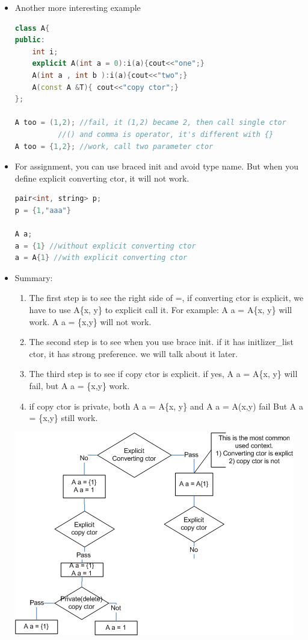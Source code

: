 \documentclass[a4paper,11pt,twoside]{book}
\begin{document}
\begin{itemize}
\item Another more interesting example 

\begin{lstlisting}[frame=single, language=c++]
class A{
public:
	int i;
	explicit A(int a = 0):i(a){cout<<"one";}
	A(int a , int b ):i(a){cout<<"two";}
	A(const A &T){ cout<<"copy ctor";} 
};

A too = (1,2); //fail, it (1,2) became 2, then call single ctor
          //() and comma is operator, it's different with {}
A too = {1,2}; //work, call two parameter ctor
\end{lstlisting}


	\item For assignment, you can use braced init and avoid type name. But when you define explicit converting ctor, it will not work. 
\begin{lstlisting}[frame=single, language=c++]
pair<int, string> p;
p = {1,"aaa"}

A a;
a = {1} //without explicit converting ctor
a = A{1} //with explicit converting ctor
\end{lstlisting}


\item Summary:
\begin{enumerate}
	\item The first step is to see the right side of =, if converting ctor is explicit, we have to use A\{x, y\} to explicit call it. For example: A a = A\{x, y\} will work. A a = \{x,y\} will not work. 
	
	\item The second step is to see when you use brace init. if it has initlizer\_list ctor, it has strong preference. we will talk about it later.
	
	\item The third step is to see if copy ctor is explicit. if yes, A a = A\{x, y\} will fail, but A a = \{x,y\} work.
	
	\item if copy ctor is private, both A a = A\{x, y\} and A a = A(x,y) fail But A a = \{x,y\} still work.
	
\end{enumerate}

	\includegraphics[scale=0.8]{pics/copy_init.png} \\


\end{itemize}
\end{document}
